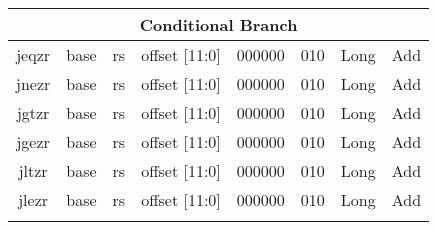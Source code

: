 \documentclass{article}
\begin{document}
\begin{center}
\begin{longtable}{|c|l|r|l|r|l|r|l|r|l|r|c|c|}
                        \multicolumn{13}{|c|}{Conditional Branch} \\
    \hline jeqzr    &   \multicolumn{2}{|c|}{base}  &   \multicolumn{2}{|c|}{rs}    &   \multicolumn{2}{|c|}{offset [11:0]} &   \multicolumn{2}{|c|}{000000}    &   \multicolumn{2}{|c|}{010}   &   Long    &   Add \\
    \hline jnezr    &   \multicolumn{2}{|c|}{base}  &   \multicolumn{2}{|c|}{rs}    &   \multicolumn{2}{|c|}{offset [11:0]} &   \multicolumn{2}{|c|}{000000}    &   \multicolumn{2}{|c|}{010}   &   Long    &   Add \\
    \hline jgtzr    &   \multicolumn{2}{|c|}{base}  &   \multicolumn{2}{|c|}{rs}    &   \multicolumn{2}{|c|}{offset [11:0]} &   \multicolumn{2}{|c|}{000000}    &   \multicolumn{2}{|c|}{010}   &   Long    &   Add \\
    \hline jgezr    &   \multicolumn{2}{|c|}{base}  &   \multicolumn{2}{|c|}{rs}    &   \multicolumn{2}{|c|}{offset [11:0]} &   \multicolumn{2}{|c|}{000000}    &   \multicolumn{2}{|c|}{010}   &   Long    &   Add \\
    \hline jltzr    &   \multicolumn{2}{|c|}{base}  &   \multicolumn{2}{|c|}{rs}    &   \multicolumn{2}{|c|}{offset [11:0]} &   \multicolumn{2}{|c|}{000000}    &   \multicolumn{2}{|c|}{010}   &   Long    &   Add \\
    \hline jlezr    &   \multicolumn{2}{|c|}{base}  &   \multicolumn{2}{|c|}{rs}    &   \multicolumn{2}{|c|}{offset [11:0]} &   \multicolumn{2}{|c|}{000000}    &   \multicolumn{2}{|c|}{010}   &   Long    &   Add \\
    
    
    \hline              \multicolumn{13}{|c|}{} \\
    

\end{longtable}
\end{center}
\end{document}
